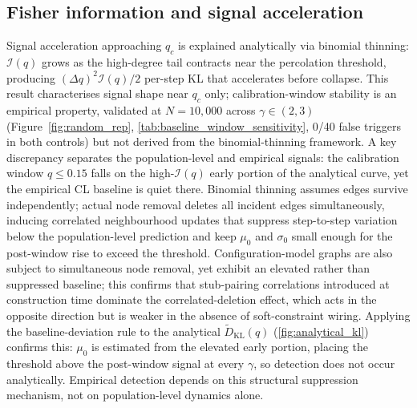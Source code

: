 \documentclass{nws}
\begin{document}
\subsection*{Fisher information and signal acceleration}
Signal acceleration approaching $q_c$ is explained analytically via binomial thinning:
$\mathcal{I}(q)$ grows as the high-degree tail contracts near the percolation threshold,
producing $(\Delta q)^2\mathcal{I}(q)/2$ per-step KL that accelerates before collapse.
This result characterises signal shape near $q_c$ only; calibration-window stability is
an empirical property, validated at $N=10{,}000$ across $\gamma\in(2,3)$ (Figure~\ref{fig:random_rep},
\autoref{tab:baseline_window_sensitivity}, 0/40 false triggers in both controls) but not
derived from the binomial-thinning framework. A key discrepancy separates the
population-level and empirical signals: the calibration window $q\le0.15$ falls on the
high-$\mathcal{I}(q)$ early portion of the analytical curve, yet the empirical CL baseline
is quiet there. Binomial thinning assumes edges survive independently; actual node removal
deletes all incident edges simultaneously, inducing correlated neighbourhood updates that
suppress step-to-step variation below the population-level prediction and keep $\mu_0$ and
$\sigma_0$ small enough for the post-window rise to exceed the threshold.
Configuration-model graphs are also subject to simultaneous node removal, yet exhibit an elevated rather than suppressed baseline; this confirms that stub-pairing correlations introduced at construction time dominate the correlated-deletion effect, which acts in the opposite direction but is weaker in the absence of soft-constraint wiring.
Applying the
baseline-deviation rule to the analytical $\tilde{D}_{\mathrm{KL}}(q)$
(\autoref{fig:analytical_kl}) confirms this: $\mu_0$ is estimated from the elevated early
portion, placing the threshold above the post-window signal at every $\gamma$, so detection
does not occur analytically. Empirical detection depends on this structural suppression
mechanism, not on population-level dynamics alone.
\end{document}
